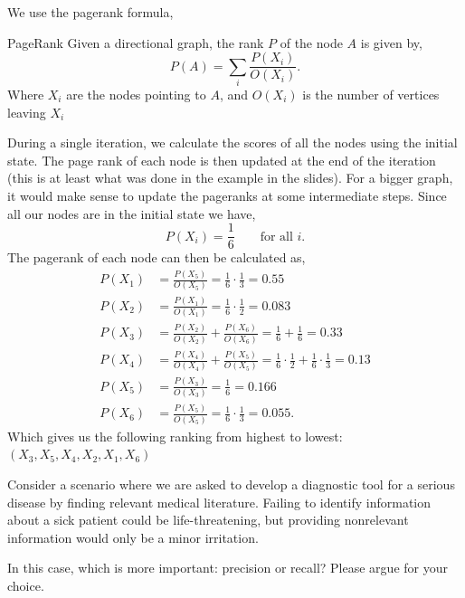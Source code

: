 \documentclass[working, oneside]{../../Preambles/tuftebook}
\begin{document}
We use the pagerank formula,
\begin{SimpleBox}{PageRank}
    Given a directional graph, the rank $P$ of the node $A$ is given by,
    \[
    P\left( A \right) = \sum_i \frac{P\left( X_i \right) }{O\left( X_i \right) }
    .\] 
    Where $X_i$ are the nodes pointing to $A$, and $O\left( X_i \right) $ is the number of vertices leaving $X_i$
\end{SimpleBox}
During a single iteration, we calculate the scores of all the nodes using the initial state. The page rank of each node is then updated at the end of the iteration (this is at least what was done in the example in the slides). For a bigger graph, it would make sense to update the pageranks at some intermediate steps. Since all our nodes are in the initial state we have,
\[
P\left( X_i \right) = \frac{1}{6} \quad\quad \text{for all }i
.\] 
The pagerank of each node can then be calculated as,
\begin{align*}
    P\left( X_1 \right) &= \frac{P\left( X_5 \right) }{O\left( X_5 \right) } = \frac{1}{6}\cdot \frac{1}{3} = 0.55\\
    P\left( X_2 \right) &= \frac{P\left( X_1 \right) }{O\left( X_1 \right) } = \frac{1}{6}\cdot \frac{1}{2}= 0.083\\
    P\left( X_3 \right) &= \frac{P\left( X_2 \right) }{O\left( X_2 \right) }+ \frac{P\left( X_6 \right) }{O\left( X_6 \right) } = \frac{1}{6} + \frac{1}{6}=0.33\\
    P\left( X_4 \right) &= \frac{P\left( X_4 \right) }{O\left( X_4 \right) } + \frac{P\left( X_5 \right) }{O\left( X_5 \right) } = \frac{1}{6}\cdot \frac{1}{2} + \frac{1}{6}\cdot \frac{1}{3}=0.13\\
    P\left( X_5 \right) &= \frac{P\left( X_3 \right) }{O\left( X_3 \right) } = \frac{1}{6}= 0.166\\
    P\left( X_6 \right) &= \frac{P\left( X_5 \right) }{O\left( X_5 \right) } = \frac{1}{6}\cdot \frac{1}{3}=0.055
.\end{align*}
Which gives us the following ranking from highest to lowest: $\left( X_3, X_5, X_4, X_2, X_1, X_6 \right) $
\begin{exercise}[d]
Consider a scenario where we are asked to develop a diagnostic tool for a
serious disease by finding relevant medical literature. Failing to identify
information about a sick patient could be life-threatening, but providing nonrelevant information would only be a minor irritation.
\end{exercise}
\begin{subexercise}{}
In this case, which is more important: precision or recall? Please argue for
your choice.
\end{subexercise}
\end{document}

